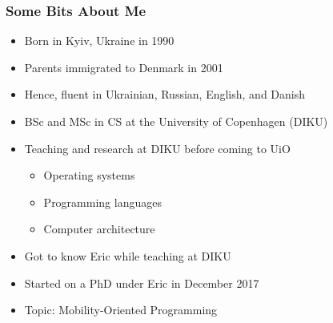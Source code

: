 \begin{frame}

\frametitle{Some Bits About Me}

\begin{itemize}

\item Born in Kyiv, Ukraine in 1990

\item Parents immigrated to Denmark in 2001

\item Hence, fluent in Ukrainian, Russian, English, and Danish

\item BSc and MSc in CS at the University of Copenhagen (DIKU)

\item Teaching and research at DIKU before coming to UiO

\begin{itemize}

\footnotesize

\item Operating systems

\item Programming languages

\item Computer architecture

\end{itemize}

\item Got to know Eric while teaching at DIKU

\item Started on a PhD under Eric in December 2017

\item Topic: Mobility-Oriented Programming

\end{itemize}

\end{frame}
